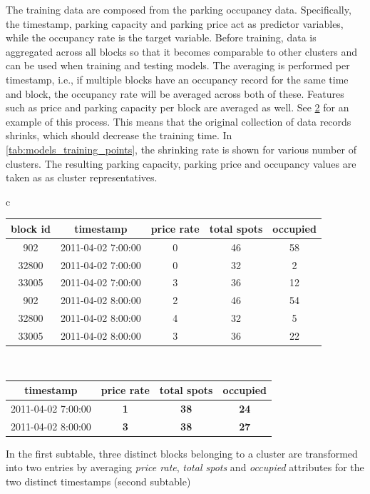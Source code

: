 	The training data are composed from the parking occupancy data. Specifically, the timestamp, parking capacity and parking price act as predictor variables, while the occupancy rate is the target variable. Before training, data is aggregated across all blocks so that it becomes comparable to other clusters and can be used when training and testing models. The averaging is performed per timestamp, i.e., if multiple blocks have an occupancy record for the same time and block, the occupancy rate will be averaged across both of these. Features such as price and parking capacity per block are averaged as well. See \cref{tab:aggregating_datapoints} for an example of this process. This means that the original collection of data records shrinks, which should decrease the training time. In \cref{tab:models_training_points}, the shrinking rate is shown for various number of clusters. The resulting parking capacity, parking price and occupancy values are taken as as cluster representatives.
	
	\begin{table}
		{\begin{tabular}{ c }
				\begin{tabular}{ | c | c | c | c | c |}
					\hline
					\textbf{block id} & \textbf{timestamp} & \textbf{price rate} & \textbf{total spots} & \textbf{occupied} \\ \hline
					902   & {2011-04-02 7:00:00} & 0 & 46 & 58 \\ \hline
					32800 & {2011-04-02 7:00:00} & 0 & 32 & 2 \\ \hline
					33005 & {2011-04-02 7:00:00} & 3 & 36 & 12 \\ \hline
					902   & {2011-04-02 8:00:00} & 2 & 46 & 54 \\ \hline
					32800 & {2011-04-02 8:00:00} & 4 & 32 & 5 \\ \hline
					33005 & {2011-04-02 8:00:00} & 3 & 36 & 22 \\ \hline
				\end{tabular} \\
				\colrule
				\begin{tabular}{ | c | c | c | c |}
					\hline
					\textbf{timestamp} & \textbf{price rate} & \textbf{total spots} & \textbf{occupied} \\ \hline
					{2011-04-02 7:00:00} & \textbf{1} & \textbf{38} & \textbf{24} \\ \hline
					{2011-04-02 8:00:00} & \textbf{3} & \textbf{38} & \textbf{27} \\ \hline
				\end{tabular}
		\end{tabular}}
		\begin{tabnote}
			In the first subtable, three distinct blocks belonging to a cluster are transformed into two entries by averaging \textit{price rate}, \textit{total spots} and \textit{occupied} attributes for the two distinct timestamps (second subtable)
		\end{tabnote}
		\label{tab:aggregating_datapoints}
	\end{table}
	
